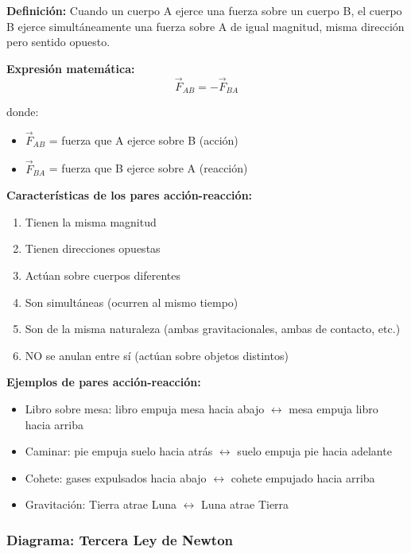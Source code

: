 \begin{seccion}
\begin{definicion}
    \textbf{Definición:} Cuando un cuerpo A ejerce una fuerza sobre un cuerpo B, el cuerpo B ejerce simultáneamente una fuerza sobre A de igual magnitud, misma dirección pero sentido opuesto.
\end{definicion}

\begin{ecuacion}
\textbf{Expresión matemática:}
$$\vec{F}_{AB} = -\vec{F}_{BA}$$

donde:
\begin{itemize}
    \item $\vec{F}_{AB}$ = fuerza que A ejerce sobre B (acción)
    \item $\vec{F}_{BA}$ = fuerza que B ejerce sobre A (reacción)
\end{itemize}
\end{ecuacion}

\textbf{Características de los pares acción-reacción:}
\begin{enumerate}
    \item Tienen la misma magnitud
    \item Tienen direcciones opuestas
    \item Actúan sobre cuerpos diferentes
    \item Son simultáneas (ocurren al mismo tiempo)
    \item Son de la misma naturaleza (ambas gravitacionales, ambas de contacto, etc.)
    \item NO se anulan entre sí (actúan sobre objetos distintos)
\end{enumerate}
\newpage
\textbf{Ejemplos de pares acción-reacción:}
\begin{itemize}
    \item Libro sobre mesa: libro empuja mesa hacia abajo $\leftrightarrow$ mesa empuja libro hacia arriba
    \item Caminar: pie empuja suelo hacia atrás $\leftrightarrow$ suelo empuja pie hacia adelante
    \item Cohete: gases expulsados hacia abajo $\leftrightarrow$ cohete empujado hacia arriba
    \item Gravitación: Tierra atrae Luna $\leftrightarrow$ Luna atrae Tierra
\end{itemize}
\end{seccion}

\subsubsection{Diagrama: Tercera Ley de Newton}

